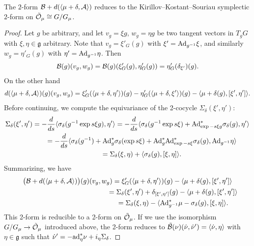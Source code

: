 \documentclass[pdftex]{sigma}
\newcommand{\A}{{\cal A}}
\newcommand{\B}{{\cal B}}
\newcommand{\lag}{\mathfrak{g}}
\newcommand{\Or}{{\cal O}}
\begin{document}
\begin{lemma} \label{lemma:sympform} The $2$-form $\B+d(\langle \mu +\delta, \A\rangle)$ reduces to the Kirillov--Kostant--Souriau symplectic $2$-form on $\tilde \Or_\mu \cong G/G_\mu$. \end{lemma}
\begin{proof}
Let $g$ be arbitrary, and let $v_g = \xi g$, $w_g= \eta g$ be two tangent vectors in $T_gG$ with $\xi,\eta\in\lag$ arbitrary. Note that $v_g=\xi'_G(g)$ with $\xi'= {\rm Ad}_{g^{-1}}\xi$, and similarly $w_g=\eta'_G(g)$ with $\eta'= {\rm Ad}_{g^{-1}}\eta$. Then \[\B(g)(v_g,w_g)  = \B(g)(\xi'_G(g),\eta'_G(g)) = \eta'_G(\delta_{\xi'})(g).\]  On the other hand
\[d(\langle \mu +\delta, \A\rangle)(g)(v_g,w_g)  = \xi'_G(\langle \mu+\delta, \eta'\rangle)(g)- \eta'_G(\langle \mu+\delta, \xi'\rangle)(g) - \langle\mu+\delta(g), [\xi',\eta']\rangle.\]
Before continuing, we compute the equivariance of the 2-cocycle $\Sigma_\delta(\xi',\eta')$:
\begin{gather*}
\Sigma_\delta(\xi',\eta')  = -\frac{d}{ds} \langle \sigma_\delta(g^{-1}\exp s  \xi g) ,\eta'\rangle
 =  -\frac{d}{ds} \langle \sigma_\delta(g^{-1}\exp s  \xi)  + {\rm Ad}^*_{\exp - s\xi g} \sigma_\delta(g),\eta'\rangle  \\
 \phantom{\Sigma_\delta(\xi',\eta')}{}
 =    -\frac{d}{ds} \langle \sigma_\delta(g^{-1}) + {\rm Ad}^*_{g} \sigma_\delta(\exp s\xi)  + {\rm Ad}^*_{g} {\rm Ad}^*_{\exp - s\xi} \sigma_\delta(g),{\rm Ad}_{g^{-1}}\eta\rangle \\
 \phantom{\Sigma_\delta(\xi',\eta')}{}
  = \Sigma_\delta(\xi,\eta) + \langle \sigma_\delta(g), [\xi,\eta]\rangle.
  \end{gather*}
Summarizing, we have
\begin{gather*}
\big(\B+d(\langle \mu +\delta, \A\rangle)\big)(g)(v_g,w_g)  =
\xi'_G(\langle \mu+\delta, \eta'\rangle)(g)  - \langle\mu+\delta(g), [\xi',\eta'] \rangle \\
 \phantom{\big(\B+d(\langle \mu +\delta, \A\rangle)\big)(g)(v_g,w_g)}{}
 = \Sigma_\delta(\xi',\eta') + \delta_{[\xi',\eta']} (g)  - \langle\mu+\delta(g), [\xi',\eta']\rangle \\
\phantom{\big(\B+d(\langle \mu +\delta, \A\rangle)\big)(g)(v_g,w_g)}{}
 = \Sigma_\delta(\xi,\eta) - \langle {\rm Ad}^*_{g^{-1}} \mu -\sigma_\delta(g) , [\xi,\eta] \rangle.
 \end{gather*}
This 2-form is reducible to a 2-form on $\tilde\Or_\mu$. If we use the isomorphism $G/G_\mu \to \tilde \Or_\mu$ introduced above, the 2-form reduces to $\tilde \B (\nu)(\dot \nu, \dot \nu') = \langle \dot \nu, \eta\rangle$ with $\eta\in\lag$ such that $\dot \nu ' = -{\rm ad}^*_\eta\nu + i_\eta\Sigma_\delta$.
\end{proof}
\end{document}
